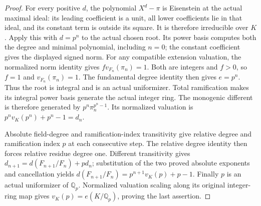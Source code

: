 \begin{proof}
For every positive $d$, the polynomial $X^d-\pi$ is Eisenstein
at the actual maximal ideal: its leading coefficient is a unit,
all lower coefficients lie in that ideal, and its constant term
is outside its square. It is therefore irreducible over $K$.
Apply this with $d=p^n$ to the actual chosen root. Its power basis
computes both the degree and minimal polynomial, including $n=0$;
the constant coefficient gives the displayed signed norm.
For any compatible extension valuation, the normalized norm identity
gives $f v_{F_n}(\pi_n)=1$. Both are integers and $f>0$, so
$f=1$ and $v_{F_n}(\pi_n)=1$. The fundamental degree identity
then gives $e=p^n$. Thus the root is integral and is an actual
uniformizer. Total ramification makes its integral power basis
generate the actual integer ring. The monogenic different is
therefore generated by $p^n\pi_n^{p^n-1}$. Its normalized
valuation is $p^n v_K(p^n)+p^n-1=d_n$.

Absolute field-degree and ramification-index transitivity give
relative degree and ramification index $p$ at each consecutive
step. The relative degree identity then forces relative residue
degree one. Different transitivity gives
$d_{n+1}=d(F_{n+1}/F_n)+p d_n$; substitution of the two proved
absolute exponents and cancellation yields
$d(F_{n+1}/F_n)=p^{n+1}v_K(p)+p-1$.
Finally $p$ is an actual uniformizer of $\mathbb Q_p$.
Normalized valuation scaling along its original integer-ring map
gives $v_K(p)=e(K/\mathbb Q_p)$, proving the last assertion.
\end{proof}

